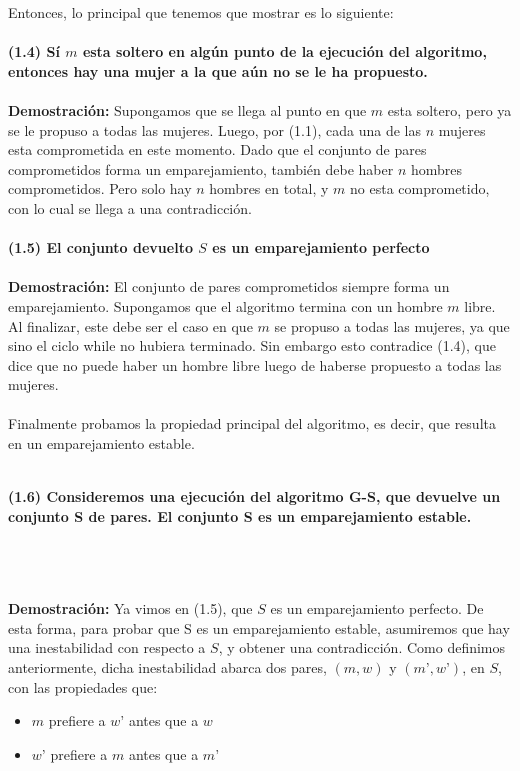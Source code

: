 \documentclass[a4paper]{article}
\begin{document}
Entonces, lo principal que tenemos que mostrar es lo siguiente:
  \\ 
  \\
    \textbf{(1.4) Sí $m$ esta soltero en algún punto de la ejecución del algoritmo, entonces hay una mujer a la que aún no se le ha propuesto.
 }
    \\
      \\ 
  \textbf{Demostración:} Supongamos que se llega al punto en que $m$ esta soltero, pero ya se le propuso a todas las mujeres. Luego, por (1.1), cada una de las $n$ mujeres esta comprometida en este momento. Dado que el conjunto de pares comprometidos forma un emparejamiento, también debe haber $n$ hombres comprometidos. Pero solo hay $n$ hombres en total, y $m$ no esta comprometido, con lo cual se llega a una contradicción. 
  \\ 
 \\
    \textbf{(1.5) El conjunto devuelto $S$ es un emparejamiento 		perfecto}
    \\ \\
    \textbf{Demostración:} El conjunto de pares comprometidos siempre forma un emparejamiento. Supongamos que el algoritmo termina con un hombre $m$ libre. Al finalizar, este debe ser el caso en que $m$ se propuso a todas las mujeres, ya que sino el ciclo while no hubiera terminado. Sin embargo esto contradice (1.4), que dice que no puede haber un hombre libre luego de haberse propuesto a todas las mujeres.
 \\ \\
 Finalmente probamos la propiedad principal del algoritmo, es decir, que resulta en un emparejamiento estable.\\ \\
 \colorbox{mygray}{\parbox{15cm}{
\textbf{(1.6) Consideremos una ejecución del algoritmo G-S, que devuelve un conjunto S de pares. El conjunto S es un emparejamiento estable.}}}\\
      \\ \\
   \textbf{Demostración:} Ya vimos en (1.5), que $S$ es un emparejamiento perfecto. De esta forma, para probar que S es un emparejamiento estable, asumiremos que hay una inestabilidad con respecto a $S$, y obtener una contradicción. Como definimos anteriormente, dicha inestabilidad abarca dos pares, $(m,w)$ y $(m’,w’)$, en $S$, con las propiedades que:
  \\
   \begin{itemize}
      \item $m$ prefiere a $w’$ antes que a $w$ 
      \item $w’$ prefiere a $m$ antes que a $m’$
    \end{itemize}
\end{document}
